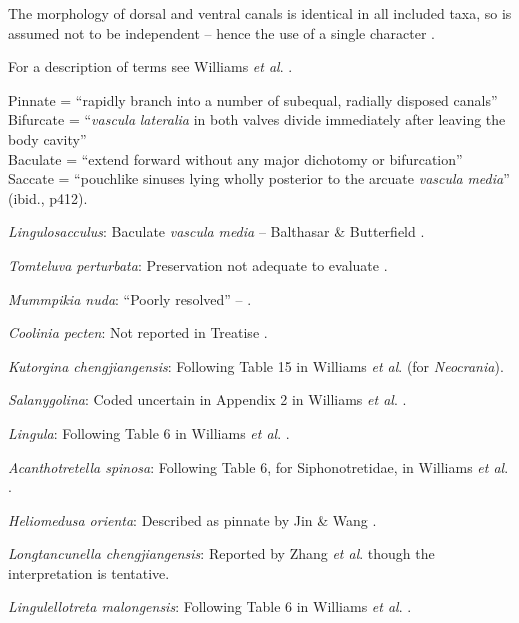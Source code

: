 \documentclass[]{book}
\theoremstyle{definition}
\theoremstyle{definition}
\theoremstyle{definition}
\theoremstyle{remark}
\begin{document}
The morphology of dorsal and ventral canals is identical in all included
taxa, so is assumed not to be independent -- hence the use of a single
character \citep[contra][]{Williams2000BrachiopodaLinguliformea}.

For a description of terms see Williams \emph{et al}.
\citeyearpar[2000]{Williams1997BrachiopodaRevised}.

Pinnate = ``rapidly branch into a number of subequal, radially disposed
canals''\\
Bifurcate = ``\emph{vascula} \emph{lateralia} in both valves divide
immediately after leaving the body cavity''\\
Baculate = ``extend forward without any major dichotomy or bifurcation''
\citep[ p.~418]{Williams1997BrachiopodaRevised}\\
Saccate = ``pouchlike sinuses lying wholly posterior to the arcuate
\emph{vascula} \emph{media}'' (ibid., p412).

\emph{Lingulosacculus}: Baculate \emph{vascula} \emph{media} --
Balthasar \& Butterfield \citeyearpar{Balthasar2009EarlyCambrian}.

\emph{Tomteluva perturbata}: Preservation not adequate to evaluate
\citep{Streng2016Anew}.

\emph{Mummpikia nuda}: ``Poorly resolved'' --
\citet{Balthasar2008iMummpikia}.

\emph{Coolinia pecten}: Not reported in Treatise
\citep{Williams2000BrachiopodaLinguliformea}.

\emph{Kutorgina chengjiangensis}: Following Table 15 in Williams
\emph{et al}. \citeyearpar{Williams2000BrachiopodaLinguliformea} (for
\emph{Neocrania}).

\emph{Salanygolina}: Coded uncertain in Appendix 2 in Williams \emph{et
al}. \citeyearpar{Williams1998Thediversity}.

\emph{Lingula}: Following Table 6 in Williams \emph{et al}.
\citeyearpar{Williams2000BrachiopodaLinguliformea}.

\emph{Acanthotretella spinosa}: Following Table 6, for Siphonotretidae,
in Williams \emph{et al}.
\citeyearpar{Williams2000BrachiopodaLinguliformea}.

\emph{Heliomedusa orienta}: Described as pinnate by Jin \& Wang
\citeyearpar{Jin1992Revisionof}.

\emph{Longtancunella chengjiangensis}: Reported by Zhang \emph{et al}.
\citeyearpar[2011T]{Zhang2007Agregarious} though the interpretation is
tentative.

\emph{Lingulellotreta malongensis}: Following Table 6 in Williams
\emph{et al}. \citeyearpar{Williams2000BrachiopodaLinguliformea}.
\end{document}
